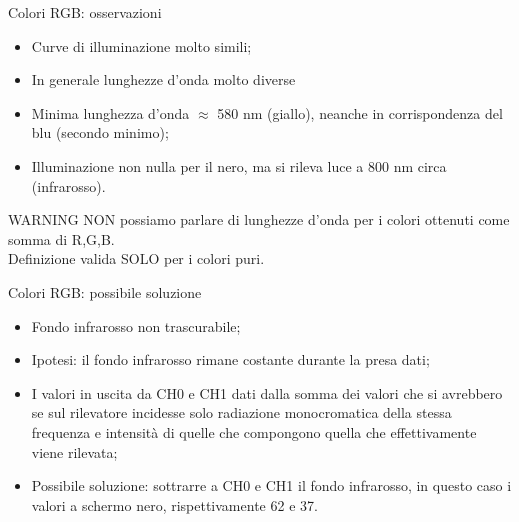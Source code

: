 \documentclass{beamer}
\begin{document}
\begin{frame}{Colori RGB: osservazioni}
\begin{itemize}
\item Curve di illuminazione molto simili;\\
\item In generale lunghezze d'onda molto diverse
\item Minima lunghezza d'onda $\approx$ 580 nm (giallo), neanche in corrispondenza del blu (secondo minimo);\\
\item Illuminazione non nulla per il nero, ma si rileva luce a 800 nm circa (infrarosso).
\end{itemize}
\end{frame}

\begin{frame}{WARNING}
NON possiamo parlare di lunghezze d'onda per i colori ottenuti come somma di R,G,B.\\
Definizione valida SOLO per i colori puri.
\end{frame}

\begin{frame}{Colori RGB: possibile soluzione}
\begin{itemize}
\item Fondo infrarosso non trascurabile;
\item Ipotesi: il fondo infrarosso rimane costante durante la presa dati;
\item I valori in uscita da CH0 e CH1 dati dalla somma dei valori che si avrebbero se sul rilevatore incidesse solo radiazione monocromatica della stessa frequenza e intensità di quelle che compongono quella che effettivamente viene rilevata;
\item Possibile soluzione: sottrarre a CH0 e CH1 il fondo infrarosso, in questo caso i valori a schermo nero, rispettivamente 62 e 37.
\end{itemize}
\end{frame}
\end{document}
